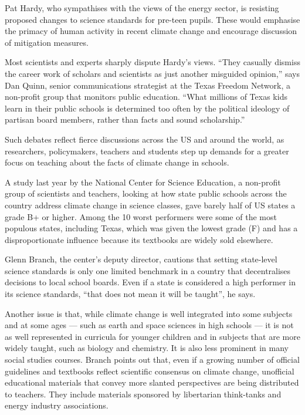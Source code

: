 Pat Hardy, who sympathises with the views of the energy sector, is resisting proposed changes to science standards for pre-teen pupils. These would emphasise the primacy of human activity in recent climate change and encourage discussion of mitigation measures.

Most scientists and experts sharply dispute Hardy's views. ``They casually dismiss the career work of scholars and scientists as just another misguided opinion,'' says Dan Quinn, senior communications strategist at the Texas Freedom Network, a non-profit group that monitors public education. ``What millions of Texas kids learn in their public schools is determined too often by the political ideology of partisan board members, rather than facts and sound scholarship.''

Such debates reflect fierce discussions across the US and around the world, as researchers, policymakers, teachers and students step up demands for a greater focus on teaching about the facts of climate change in schools.

A study last year by the National Center for Science Education, a non-profit group of scientists and teachers, looking at how state public schools across the country address climate change in science classes, gave barely half of US states a grade B+ or higher. Among the 10 worst performers were some of the most populous states, including Texas, which was given the lowest grade (F) and has a disproportionate influence because its textbooks are widely sold elsewhere.

Glenn Branch, the center's deputy director, cautions that setting state-level science standards is only one limited benchmark in a country that decentralises decisions to local school boards. Even if a state is considered a high performer in its science standards, ``that does not mean it will be taught'', he says.

Another issue is that, while climate change is well integrated into some subjects and at some ages — such as earth and space sciences in high schools — it is not as well represented in curricula for younger children and in subjects that are more widely taught, such as biology and chemistry. It is also less prominent in many social studies courses.
Branch points out that, even if a growing number of official guidelines and textbooks reflect scientific consensus on climate change, unofficial educational materials that convey more slanted perspectives are being distributed to teachers. They include materials sponsored by libertarian think-tanks and energy industry associations.


